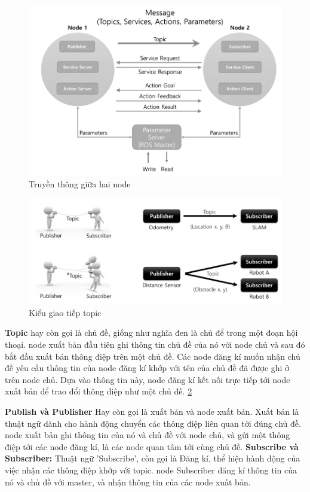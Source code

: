 {\begin{figure}[htbp]
  \centering
  \includegraphics[width=0.8\linewidth]{figures/messageCommunication.png}
  \caption{Truyền thông giữa hai node}
  \label{fig:messageCommunication}
\end{figure}

\begin{figure}[htbp]
  \centering
  \includegraphics[width=0.9\linewidth]{figures/topic.png}
  \caption{Kiểu giao tiếp topic}
  \label{fig:topic}
\end{figure}

\textbf{Topic} hay còn gọi là chủ đề, giống như nghĩa đen là chủ để trong một đoạn hội thoại. node xuất bản đầu tiên ghi thông tin chủ đề của nó với node chủ và sau đó bắt đầu xuất bản thông điệp trên một chủ đề. Các node đăng kí muốn nhận chủ đề yêu cầu thông tin của node đăng kí khớp với tên của chủ đề đã được ghi ở trên node chủ. Dựa vào thông tin này, node đăng kí kết nối trực tiếp tới node xuất bản để trao đổi thông điệp như một chủ đề. \figurename{ \ref{fig:topic}}

\textbf{Publish và Publisher} Hay còn gọi là xuất bản và node xuất bản. Xuất bản là thuật ngữ dành cho hành động chuyển các thông điệp liên quan tới đúng chủ đề. node xuất bản ghi thông tin của nó và chủ đề với node chủ, và gửi một thông điệp tới các node đăng kí, là các node quan tâm tới cùng chủ đề.
\textbf{Subscribe và Subscriber:} Thuật ngữ 'Subscribe', còn gọi là Đăng kí, thể hiện hành động của việc nhận các thông điệp khớp với topic. node Subscriber đăng kí thông tin của nó và chủ đề với master, và nhận thông tin của các node xuất bản.

}
